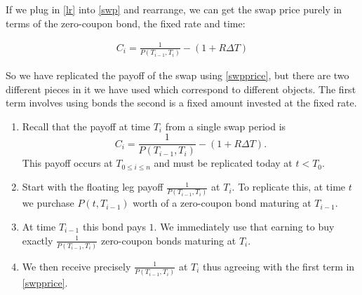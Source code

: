 \documentclass[9pt]{extarticle}
\begin{document}
If we plug in \eqref{lr} into \eqref{swp} and rearrange, we can get the swap price purely in terms of the zero-coupon bond, 
the fixed rate and time:

\begin{align}\label{swpprice}
  C_i = \frac{1}{P(T_{i-1},T_i)} - (1+R\Delta T) 
\end{align}

So we have replicated the payoff of the swap using \eqref{swpprice}, but there are two different pieces in it we have used 
which correspond to different objects. The first term involves using bonds the second is a fixed amount invested at the 
fixed rate. 
\begin{enumerate}
  \item Recall that the payoff at time $T_i$ from a single swap period is 
  \[
    C_i = \frac{1}{P(T_{i-1},T_i)} - (1+R\Delta T).
  \]
  This payoff occurs at $T_{0\leq i\leq n}$ and must be replicated today at $t < T_0$.
  
  \item Start with the floating leg payoff $\tfrac{1}{P(T_{i-1},T_i)}$ at $T_i$.  
  To replicate this, at time $t$ we purchase $P(t,T_{i-1})$ worth of a zero-coupon bond maturing at $T_{i-1}$.
  
  \item At time $T_{i-1}$ this bond pays $1$. We immediately use that earning to buy exactly $\tfrac{1}{P(T_{i-1},T_i)}$ zero-coupon bonds maturing at $T_i$.
  
  \item We then receive precisely $\tfrac{1}{P(T_{i-1},T_i)}$ at $T_i$ thus 
  agreeing with the first term in \eqref{swpprice}.  
  

\end{enumerate}
\end{document}
